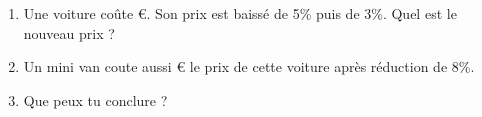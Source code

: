 
\begin{enumerate}
\item Une voiture coûte  €. Son prix est baissé de 5\% puis de 3\%. Quel est le nouveau prix ?
\item Un mini van coute aussi  € le prix de cette voiture après réduction de 8\%. 
\item Que peux tu conclure ?
\end{enumerate}
